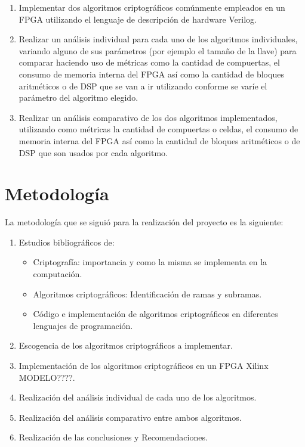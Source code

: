 \begin{enumerate}

\item Implementar dos algoritmos criptográficos comúnmente empleados en un FPGA utilizando el lenguaje de descripción de hardware Verilog.

\item Realizar un análisis individual para cada uno de los algoritmos individuales, variando alguno de sus parámetros (por ejemplo el tamaño de la llave) para comparar haciendo uso de métricas como la cantidad de compuertas, el consumo de memoria interna del FPGA así como la cantidad de bloques aritméticos o de DSP que se van a ir utilizando conforme se varíe el parámetro del algoritmo elegido.

\item Realizar un análisis comparativo de los dos algoritmos implementados, utilizando como métricas la cantidad de compuertas o celdas, el consumo de memoria interna del FPGA así como la cantidad de bloques aritméticos o de DSP que son usados por cada algoritmo.


\end{enumerate}

\section{Metodología}

La metodología que se siguió para la realización del proyecto es la siguiente:

\begin{enumerate}

\item Estudios bibliográficos de:

\begin{itemize}
	\item Criptografía: importancia y como la misma se implementa en la computación.
	\item Algoritmos criptográficos: Identificación de ramas y subramas.
	\item Código e implementación de algoritmos criptográficos en diferentes lenguajes de programación.
\end{itemize}

\item Escogencia de los algoritmos criptográficos a implementar.

\item Implementación de los algoritmos criptográficos en un FPGA Xilinx MODELO????.

\item Realización del análisis individual de cada uno de los algoritmos.

\item Realización del análisis comparativo entre ambos algoritmos.

\item Realización de las conclusiones y Recomendaciones.

\end{enumerate}


